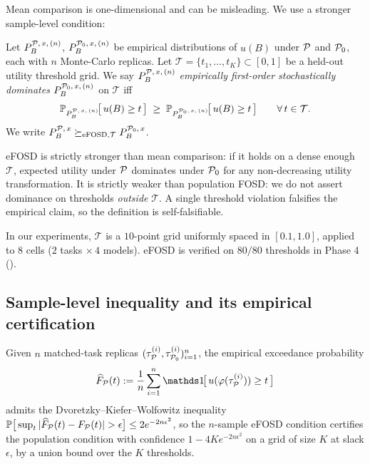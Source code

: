 Mean comparison is one-dimensional and can be misleading. We use a stronger sample-level condition:

\begin{definition}[eFOSD]
\label{def:efosd}
Let $P_B^{\mathcal{P},\,x,\,(n)}$, $P_B^{\mathcal{P}_0,\,x,\,(n)}$ be empirical distributions of $u(B)$ under $\mathcal{P}$ and $\mathcal{P}_0$, each with $n$ Monte-Carlo replicas. Let $\mathcal{T} = \{t_1, \ldots, t_K\} \subset [0,1]$ be a held-out utility threshold grid. We say $P_B^{\mathcal{P},\,x,\,(n)}$ \emph{empirically first-order stochastically dominates} $P_B^{\mathcal{P}_0,\,x,\,(n)}$ on $\mathcal{T}$ iff
\begin{equation}
  \mathbb{P}_{P_B^{\mathcal{P},\,x,\,(n)}}\!\big[\, u(B) \ge t \,\big]
  \;\ge\;
  \mathbb{P}_{P_B^{\mathcal{P}_0,\,x,\,(n)}}\!\big[\, u(B) \ge t \,\big]
  \qquad \forall\, t \in \mathcal{T}.
  \label{eq:efosd-condition}
\end{equation}
We write $P_B^{\mathcal{P},\,x} \succeq_{\mathrm{eFOSD},\mathcal{T}} P_B^{\mathcal{P}_0,\,x}$.
\end{definition}

\begin{remark}
eFOSD is strictly stronger than mean comparison: if it holds on a dense enough $\mathcal{T}$, expected utility under $\mathcal{P}$ dominates under $\mathcal{P}_0$ for any non-decreasing utility transformation. It is strictly weaker than population FOSD: we do not assert dominance on thresholds \emph{outside} $\mathcal{T}$. A single threshold violation falsifies the empirical claim, so the definition is self-falsifiable.
\end{remark}

In our experiments, $\mathcal{T}$ is a $10$-point grid uniformly spaced in $[0.1, 1.0]$, applied to $8$ cells ($2$ tasks $\times\,4$ models). eFOSD is verified on $80/80$ thresholds in Phase 4 ().

\subsection{Sample-level inequality and its empirical certification}

\begin{lemma}
\label{lemma:efosd-cert}
Given $n$ matched-task replicas $(\tau^{(i)}_{\mathcal{P}}, \tau^{(i)}_{\mathcal{P}_0})_{i=1}^{n}$, the empirical exceedance probability
\begin{equation}
  \widehat{F}_{\proto}(t) := \frac{1}{n} \sum_{i=1}^{n} \ind\!\big[\, u(\varphi(\tau^{(i)}_{\proto})) \ge t \,\big]
  \label{eq:empirical-exceedance}
\end{equation}
admits the Dvoretzky--Kiefer--Wolfowitz inequality $\mathbb{P}\big[\sup_t |\widehat{F}_{\mathcal{P}}(t) - F_{\mathcal{P}}(t)| > \epsilon\big] \le 2 e^{-2 n \epsilon^2}$, so the $n$-sample eFOSD condition certifies the population condition with confidence $1 - 4 K e^{-2 n \epsilon^2}$ on a grid of size $K$ at slack $\epsilon$, by a union bound over the $K$ thresholds.
\end{lemma}


